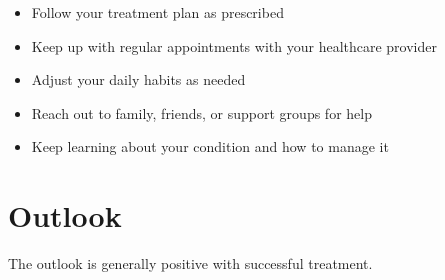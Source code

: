 \begin{itemize}[noitemsep]
  \item Follow your treatment plan as prescribed
  \item Keep up with regular appointments with your healthcare provider
  \item Adjust your daily habits as needed
  \item Reach out to family, friends, or support groups for help
  \item Keep learning about your condition and how to manage it
\end{itemize}

\section{Outlook}
The outlook is generally positive with successful treatment.
